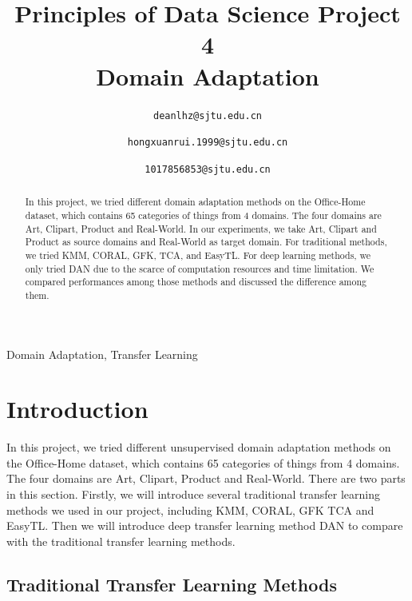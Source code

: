 \documentclass[conference]{IEEEtran}
\begin{document}


\title{Principles of Data Science Project 4\\
Domain Adaptation}

\author{
\texttt{deanlhz@sjtu.edu.cn}
\and
{}
\texttt{hongxuanrui.1999@sjtu.edu.cn}
\and
{}
\texttt{1017856853@sjtu.edu.cn}
}

\maketitle

\begin{abstract}
In this project, we tried different domain adaptation methods on the Office-Home dataset, which contains 65 categories of things from 4 domains.
The four domains are Art, Clipart, Product and Real-World. In our experiments, we take Art, Clipart and Product as source domains and Real-World as target domain.
For traditional methods, we tried KMM, CORAL, GFK, TCA, and EasyTL. For deep learning methods, we only tried DAN due to the scarce of computation resources and time limitation.
We compared performances among those methods and discussed the difference among them. 
\end{abstract}

\begin{IEEEkeywords}
Domain Adaptation, Transfer Learning
\end{IEEEkeywords}

\section{Introduction}

In this project, we tried different unsupervised domain adaptation methods on the Office-Home dataset, which contains 65 categories of things from 4 domains. The four domains are Art, Clipart, Product and Real-World. There are two parts in this section. Firstly, we will introduce several traditional transfer learning
methods we used in our project, including KMM, CORAL, GFK TCA and EasyTL. Then we will introduce deep transfer learning method DAN to compare with the traditional transfer learning methods.

\subsection{Traditional Transfer Learning Methods}
\end{document}
